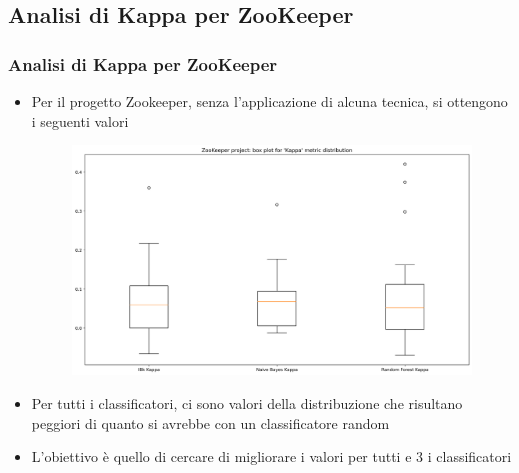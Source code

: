\documentclass[10pt]{beamer}
\begin{document}
\begin{frame}
\section{Analisi di Kappa per ZooKeeper}
\frametitle{Analisi di Kappa per ZooKeeper}
\begin{itemize}
\item Per il progetto Zookeeper, senza l'applicazione di alcuna tecnica, si ottengono i seguenti valori
\begin{figure}
\includegraphics[scale=0.25]{images/k_base_zk}
\end{figure}
\item Per tutti i classificatori, ci sono valori della distribuzione che risultano peggiori di quanto si avrebbe con un classificatore random
\item L'obiettivo è quello di cercare di migliorare i valori per tutti e 3 i classificatori
\end{itemize}
\end{frame}
\end{document}
